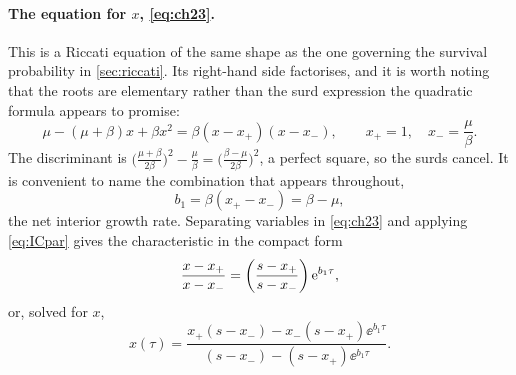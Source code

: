 \paragraph{The equation for $x$, \cref{eq:ch23}.}
This is a Riccati equation of the same shape as the one governing the survival probability
in \cref{sec:riccati}. Its right-hand side factorises, and it is worth noting that the
roots are elementary rather than the surd expression the quadratic formula appears to
promise:
\begin{equation}
\label{eq:xpm}
\mu-(\mu+\beta)x+\beta x^2 = \beta(x-x_+)(x-x_-),
\qquad
x_+ = 1,\quad x_- = \frac{\mu}{\beta} .
\end{equation}
The discriminant is
$\bigl(\tfrac{\mu+\beta}{2\beta}\bigr)^2 - \tfrac{\mu}{\beta}
= \bigl(\tfrac{\beta-\mu}{2\beta}\bigr)^2$, a perfect square, so the surds cancel. It is
convenient to name the combination that appears throughout,
\begin{equation}
\label{eq:b1}
b_1 = \beta(x_+-x_-) = \beta-\mu ,
\end{equation}
the net interior growth rate. Separating variables in \cref{eq:ch23} and applying
\cref{eq:ICpar} gives the characteristic in the compact form
\begin{equation}
\label{eq:xratio}
\frac{x-x_+}{x-x_-} = \left(\frac{s-x_+}{s-x_-}\right){\rm e}^{b_1\tau},
\end{equation}
or, solved for $x$,
\begin{equation}
\label{eq:xabd}
x(\tau) = \frac{x_+(s-x_-) - x_-(s-x_+)\ee^{b_1\tau}}
               {(s-x_-) - (s-x_+)\ee^{b_1\tau}} .
\end{equation}

